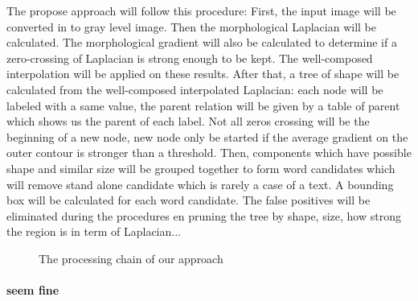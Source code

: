 \par The propose approach will follow this procedure: First, the input image will be converted in to gray level image. Then the morphological Laplacian will be calculated. The morphological gradient will also be calculated to determine if a zero-crossing of Laplacian is strong enough to be kept. The well-composed interpolation will be applied on these results. After that, a tree of shape will be calculated from the well-composed interpolated Laplacian: each node will be labeled with a same value, the parent relation will be given by a table of parent which shows us the parent of each label. Not all zeros crossing will be the beginning of a new node, new node only be started if the average gradient on the outer contour is stronger than a threshold. Then, components which have possible shape and similar size will be grouped together to form word candidates which will remove stand alone candidate which is rarely a case of a text. A bounding box will be calculated for each word candidate. The false positives will be eliminated during the procedures en pruning the tree by shape, size, how strong the region is in term of Laplacian...

\begin{figure}
 \begin{center}
  \caption{The processing chain of our approach}
  \label{Process}
 \end{center}
\end{figure}

\paragraph{seem fine}